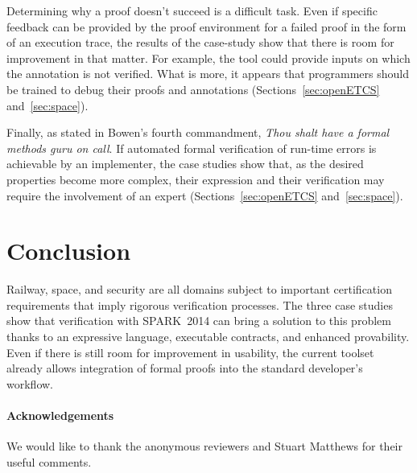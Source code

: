 \documentclass[10pt,a4paper,twocolumn]{article}
\newcommand{\newspark}{SPARK~2014\xspace}
\begin{document}
Determining why a proof doesn't succeed is a difficult
task. Even if specific feedback can be provided by the proof
environment for a failed proof in the form of an execution trace, the
results of the case-study show that there is room for improvement in
that matter. For example, the tool could provide inputs on which the
annotation is not verified.  What is more, it appears that programmers
should be trained to debug their proofs and annotations
(Sections~\ref{sec:openETCS} and~\ref{sec:space}).

Finally, as stated in Bowen's fourth commandment, \emph{Thou shalt
  have a formal methods guru on call}. If automated formal
verification of run-time errors is achievable by an implementer, the
case studies show that, as the desired properties become more complex,
their expression and their verification may require the involvement of
an expert (Sections~\ref{sec:openETCS} and~\ref{sec:space}).

\section{Conclusion}

Railway, space, and security are all domains subject to important
certification requirements that imply rigorous verification
processes. The three case studies show that verification with
\newspark can bring a solution to this problem thanks to an expressive
language, executable contracts, and enhanced provability. Even if
there is still room for improvement in usability, the current toolset
already allows integration of formal proofs into the standard
developer's workflow.

\paragraph*{Acknowledgements}

We would like to thank the anonymous reviewers and Stuart Matthews for their
useful comments.



\end{document}
